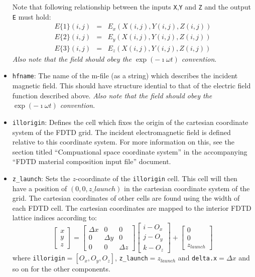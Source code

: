 \documentclass[a4paper, 12pt]{article}
\begin{document}
\begin{itemize}
\begin{itemize}
		\end{itemize}
		Note that following relationship between the inputs
		\verb+X+,\verb+Y+ and \verb+Z+ and the output \verb+E+ must hold:
		\begin{eqnarray}
			E\{1\}(i,j)& =& E_x(X(i,j),Y(i,j),Z(i,j))  \nonumber \\ 
			E\{2\}(i,j)& =& E_y(X(i,j),Y(i,j),Z(i,j)) \nonumber \\
			E\{3\}(i,j)& =& E_z(X(i,j),Y(i,j),Z(i,j)) \nonumber
		\end{eqnarray}
		\emph{Also note that the field should obey the $\exp(-\imath \omega t)$ convention}.
		\item \verb+hfname+: The name of the m-file (as a string) which describes the
		incident magnetic field. This should have structure idential to that
		of the electric field function described above. \emph{Also note that
			the field should obey the $\exp(-\imath \omega t)$ convention}.
		\item \verb+illorigin+: Defines the cell which fixes the origin
		of the cartesian coordinate system of the FDTD grid. The incident
		electromagnetic field is defined relative to this coordinate
		system. For more information on this, see the section titled
		``Compuational space coordinate system'' in the accompanying ``FDTD
		material composition input file'' document. 
		\item \verb+z_launch+: Sets the $z$-coordinate of the \verb+illorigin+
		cell. This cell will then have a position of $(0,0,z\_launch)$ in the
		cartesian coordinate system of the grid. The cartesian coordinates
		of other cells are found using the width of each FDTD cell. The
		cartesian coordinates are mapped to the interior FDTD lattice
		indices according to: 
		\begin{equation}
			\left[\begin{array}{c} x\\ y\\ z\end{array}\right] = \left[\begin{array}{ccc}\Delta x & 0 & 0\\ 0 & \Delta y &
				0\\ 0 & 0 & \Delta z
			\end{array}\right]\left[\begin{array}{c}i-O_x\\j-O_y\\k-O_z\end{array}\right]+\left[\begin{array}{c} 0\\ 0\\ z_{launch}\end{array}\right]\label{eq:mapping} 
		\end{equation}
		where \verb+illorigin+$=[O_x,O_y,O_z]$, \verb+z_launch+$=z_{launch}$
		and \verb+delta.x+$=\Delta x$ and so on for the other components.
		

\end{itemize}
\end{document}
